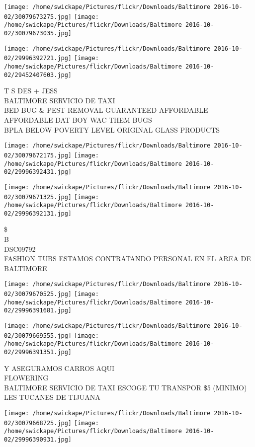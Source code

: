 \documentclass[10pt,letterpaper]{article}
\begin{document}
\texttt{[image: /home/swickape/Pictures/flickr/Downloads/Baltimore 2016-10-02/30079673275.jpg]}
\texttt{[image: /home/swickape/Pictures/flickr/Downloads/Baltimore 2016-10-02/30079673035.jpg]}

\texttt{[image: /home/swickape/Pictures/flickr/Downloads/Baltimore 2016-10-02/29996392721.jpg]}
\texttt{[image: /home/swickape/Pictures/flickr/Downloads/Baltimore 2016-10-02/29452407603.jpg]}

T S DES + JESS\\
BALTIMORE SERVICIO DE TAXI\\
BED BUG \& PEST REMOVAL GUARANTEED AFFORDABLE AFFORDABLE DAT BOY WAC THEM BUGS\\
BPLA BELOW POVERTY LEVEL ORIGINAL GLASS PRODUCTS
\pagebreak

\texttt{[image: /home/swickape/Pictures/flickr/Downloads/Baltimore 2016-10-02/30079672175.jpg]}
\texttt{[image: /home/swickape/Pictures/flickr/Downloads/Baltimore 2016-10-02/29996392431.jpg]}

\texttt{[image: /home/swickape/Pictures/flickr/Downloads/Baltimore 2016-10-02/30079671325.jpg]}
\texttt{[image: /home/swickape/Pictures/flickr/Downloads/Baltimore 2016-10-02/29996392131.jpg]}

\$\\
B\\
DSC09792\\
FASHION TUBS ESTAMOS CONTRATANDO PERSONAL EN EL AREA DE BALTIMORE
\pagebreak

\texttt{[image: /home/swickape/Pictures/flickr/Downloads/Baltimore 2016-10-02/30079670525.jpg]}
\texttt{[image: /home/swickape/Pictures/flickr/Downloads/Baltimore 2016-10-02/29996391681.jpg]}

\texttt{[image: /home/swickape/Pictures/flickr/Downloads/Baltimore 2016-10-02/30079669555.jpg]}
\texttt{[image: /home/swickape/Pictures/flickr/Downloads/Baltimore 2016-10-02/29996391351.jpg]}

Y ASEGURAMOS CARROS AQUI\\
FLOWERING\\
BALTIMORE SERVICIO DE TAXI ESCOGE TU TRANSPOR \$5 (MINIMO)\\
LES TUCANES DE TIJUANA
\pagebreak

\texttt{[image: /home/swickape/Pictures/flickr/Downloads/Baltimore 2016-10-02/30079668725.jpg]}
\texttt{[image: /home/swickape/Pictures/flickr/Downloads/Baltimore 2016-10-02/29996390931.jpg]}
\end{document}
